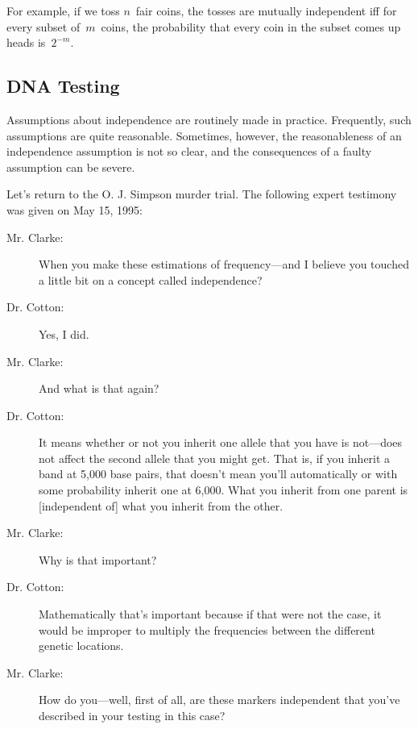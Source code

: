 \begin{editingnotes}
For example, if we toss $n$~fair coins, the tosses are mutually
independent iff for every subset of~$m$~coins, the probability that
every coin in the subset comes up heads is~$2^{-m}$.
\end{editingnotes}

\subsection{DNA Testing}

Assumptions about independence are routinely made in practice.
Frequently, such assumptions are quite reasonable.  Sometimes,
however, the reasonableness of an independence assumption is not so
clear, and the consequences of a faulty assumption can be severe.

Let's return to the O. J. Simpson murder trial.  The following expert
testimony was given on May 15, 1995:
\begin{description}

\item[Mr. Clarke:] When you make these estimations of frequency---and
I believe you touched a little bit on a concept called independence?

\item[Dr. Cotton:] Yes, I did.

\item[Mr. Clarke:] And what is that again?

\item[Dr. Cotton:] It means whether or not you inherit one allele that
  you have is not---does not affect the second allele that you might
  get.  That is, if you inherit a band at 5,000 base pairs, that
  doesn't mean you'll automatically or with some probability inherit
  one at 6,000.  What you inherit from one parent is [independent of]
  what you inherit from the other.

\item[Mr. Clarke:] Why is that important?

\item[Dr. Cotton:] Mathematically that's important because if that
were not the case, it would be improper to multiply the frequencies
between the different genetic locations.

\item[Mr. Clarke:] How do you---well, first of all, are these markers
independent that you've described in your testing in this case?

\end{description}

